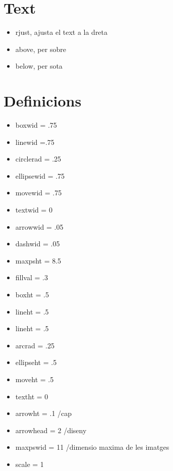\section{Text}
\begin{itemize}
\item rjust, ajusta el text a la dreta
\item above, per sobre
\item below, per sota
\end{itemize}

\section{Definicions}
\begin{itemize}
\item boxwid = .75
\item linewid =.75
\item circlerad = .25
\item ellipsewid = .75
\item movewid = .75
\item textwid = 0
\item arrowwid = .05
\item dashwid = .05
\item maxpsht = 8.5
\item fillval = .3
\item boxht = .5
\item lineht = .5
\item lineht = .5
\item arcrad = .25
\item ellipseht = .5
\item moveht = .5
\item textht = 0
\item arrowht = .1 /cap
\item arrowhead = 2 /diseny
\item maxpswid = 11 /dimensio maxima de les imatges
\item scale = 1
\end{itemize}
